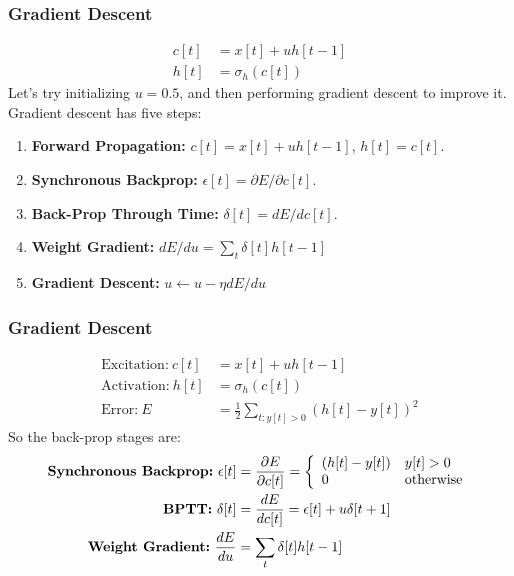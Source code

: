 \documentclass{beamer}
\begin{document}
\begin{frame}
  \frametitle{Gradient Descent}

  \begin{align*}
    c[t] &= x[t]+uh[t-1]\\
    h[t] &= \sigma_h\left(c[t]\right)
  \end{align*}
  Let's try initializing $u=0.5$, and then performing gradient descent
  to improve it.  Gradient descent has five steps:
  \begin{enumerate}
  \item {\bf Forward Propagation:} $c[t]=x[t]+uh[t-1]$, $h[t]=c[t]$.
  \item {\bf Synchronous Backprop:} $\epsilon[t]=\partial E/\partial c[t]$.
  \item {\bf Back-Prop Through Time:} $\delta[t]=dE/dc[t]$.
  \item {\bf Weight Gradient:} $dE/du=\sum_t \delta[t]h[t-1]$
  \item {\bf Gradient Descent:} $u\leftarrow u-\eta dE/du$
  \end{enumerate}
\end{frame}

\begin{frame}
  \frametitle{Gradient Descent}
  \begin{align*}
    \mbox{Excitation:}~c[t] &= x[t]+uh[t-1]\\
    \mbox{Activation:}~h[t] &= \sigma_h\left(c[t]\right)\\
    \mbox{Error:}~E &= \frac{1}{2}\sum_{t:y[t]>0} \left(h[t]-y[t]\right)^2
  \end{align*}
  So the back-prop stages are:
  \begin{align*}
    \mbox{\bf Synchronous Backprop:}~\epsilon[t] &=\frac{\partial E}{\partial c[t]}=
    \left\{\begin{array}{ll} (h[t]-y[t]) & y[t]>0\\0&\mbox{otherwise}\end{array}\right.\\
    \mbox{\bf BPTT:}~\delta[t] &=\frac{dE}{dc[t]}= \epsilon[t]+u\delta[t+1]\\
    \mbox{\bf Weight Gradient:}~\frac{dE}{du}&=\sum_t \delta[t]h[t-1]
  \end{align*}
\end{frame}
\end{document}
